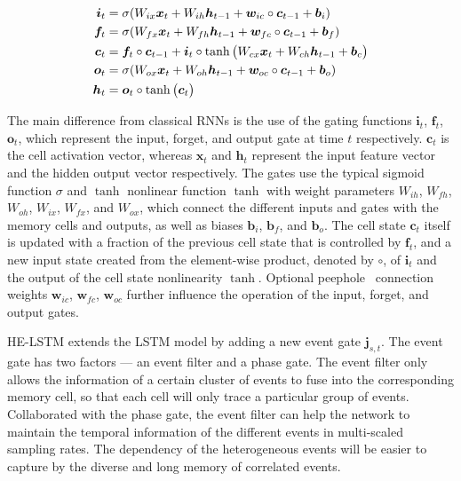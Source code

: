 \documentclass[letterpaper]{article} %
\begin{document}
\begin{align}\label{grubegin}
\setlength{\abovedisplayskip}{3pt}
\bm i_t &= \sigma(W_{ix}\bm x_t+ W_{ih}\bm h_{t-1} + \bm w_{ic} \circ \bm c_{t-1}+ \bm b_i)\\
\bm f_t &= \sigma(W_{fx}\bm x_t+ W_{fh}\bm h_{t-1} + \bm w_{fc} \circ \bm c_{t-1} + \bm b_f)\\
\bm c_t &= \bm f_t \circ \bm c_{t-1} + \bm i_t \circ \tanh\big (W_{cx}\bm x_t+ W_{ch} \bm h_{t-1} + \bm b_c \big) \\
\bm o_t &= \sigma(W_{ox}\bm x_t+ W_{oh}\bm h_{t-1} + \bm w_{oc} \circ \bm c_{t-1} + \bm b_o)\\
\bm h_t &= \bm o_t \circ \tanh \big( \bm c_t \big)
\label{gruend}
\setlength{\belowdisplayskip}{3pt}
\end{align}

The main difference from classical RNNs is the use of the gating functions $\bm i_t$, $\bm f_t$, $\bm o_t$, which represent
the input, forget, and output gate at time $t$ respectively. $\bm c_t$ is the cell activation vector, whereas $\bm x_t$
and $\bm h_t$ represent the input feature vector and the hidden output vector respectively. 
The gates use the
typical sigmoid function $\sigma $ and $\tanh$ nonlinear function $\tanh$ with weight parameters
$W_{ih}$, $W_{fh}$, $W_{oh}$, $W_{ix}$, $W_{fx}$, and $W_{ox}$, which connect the different inputs and gates with the memory
cells and outputs, as well as biases $\bm b_i$, $\bm b_f$, and $\bm b_o$. The cell state $\bm c_t$ itself is updated with a fraction of the previous cell state that is controlled by $\bm f_t$, and a new input state created from the element-wise product, denoted by $\circ$, of $\bm i_t$ and the output of the cell state nonlinearity $\tanh$. Optional peephole~\cite{gers2000recurrent} connection weights $\bm w_{ic}$, $\bm w_{fc}$, $\bm w_{oc}$ further influence the operation of the input, forget,
and output gates.

HE-LSTM extends the LSTM model by adding a new event gate $\bm j_{s,t}$. 
 The event gate has two factors --- an event filter and a phase gate. The event filter only allows the information of a certain cluster of events to fuse into the corresponding memory cell, so that each cell will only trace a particular group of events. Collaborated with the phase gate, the event filter can help the network to maintain the temporal information of the different events in multi-scaled sampling rates. The dependency of the heterogeneous events will be easier to capture by the diverse and long memory of correlated events.
 
\end{document}
